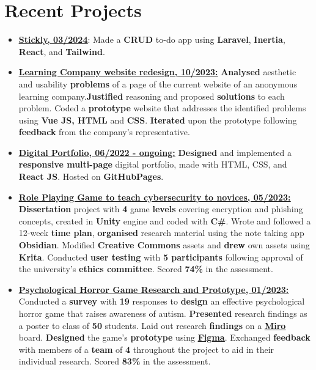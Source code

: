\documentclass[11pt]{article}
\newcommand{\ulink}[2]{\href{#1}{\uline{#2}}}
\begin{document}
    \section{Recent Projects}
    \begin{itemize}[itemsep=3pt, leftmargin=1em]
        \item \ulink{https://github.com/orbit-9j/to-do-app}{\textbf{Stickly, 03/2024}}: Made a \textbf{CRUD} to-do app using \textbf{Laravel}, \textbf{Inertia}, \textbf{React}, and \textbf{Tailwind}. 
        \item \ulink{https://orbit-9j.github.io/LearningCompanyRedesign/index.html}{\textbf{Learning Company website redesign, 10/2023:}} \textbf{Analysed} aesthetic and usability \textbf{problems} of a page of the current website of an anonymous learning company.\textbf{Justified} reasoning and proposed \textbf{solutions} to each problem. Coded a \textbf{prototype} website that addresses the identified problems using \textbf{Vue JS, HTML} and \textbf{CSS}. \textbf{Iterated} upon the prototype following \textbf{feedback} from the company's representative.
       \item \ulink{https://orbit-9j.github.io/Portfolio/}{\textbf{Digital Portfolio, 06/2022 - ongoing:}} \textbf{Designed} and implemented a \textbf{responsive multi-page} digital portfolio, made with HTML, CSS, and \textbf{React JS}. Hosted on \textbf{GitHubPages}.
       \item \ulink{https://orbit-9j.github.io/Portfolio/\#/Cyberscape:\%20a\%20Cybersecurity\%20RPG}{\textbf{Role Playing Game to teach cybersecurity to novices, 05/2023:}} \textbf{Dissertation} project with \textbf{4} game \textbf{levels} covering encryption and phishing concepts, created in \textbf{Unity} engine and coded with \textbf{C\#}. Wrote and followed a 12-week \textbf{time plan}, \textbf{organised} research material using the note taking app \textbf{Obsidian}. Modified \textbf{Creative Commons} assets and \textbf{drew} own assets using \textbf{Krita}. Conducted \textbf{user testing} with \textbf{5 participants} following approval of the university's \textbf{ethics committee}. Scored \textbf{74\%} in the assessment.
        \item \ulink{https://orbit-9j.github.io/Portfolio/\#/Psychodyssey}{\textbf{Psychological Horror Game Research and Prototype, 01/2023:}} Conducted a \textbf{survey} with \textbf{19} responses to \textbf{design} an effective psychological horror game that raises awareness of autism. \textbf{Presented} research findings as a poster to class of \textbf{50} students. Laid out research \textbf{findings} on a \textbf{\ulink{https://miro.com/app/board/uXjVPMzhjBo=/?share_link_id=722803847643}{Miro}} board. \textbf{Designed} the game's \textbf{prototype} using \textbf{\ulink{https://www.figma.com/file/pyHXkKKN4cn5MtXx4WpAHR/design-cw?t=gjgzJrZM4Dd0YaZP-1}{Figma}}. Exchanged \textbf{feedback} with members of a \textbf{team} of \textbf{4} throughout the project to aid in their individual research. Scored \textbf{83\%} in the assessment.        
    \end{itemize} 
\end{document}
